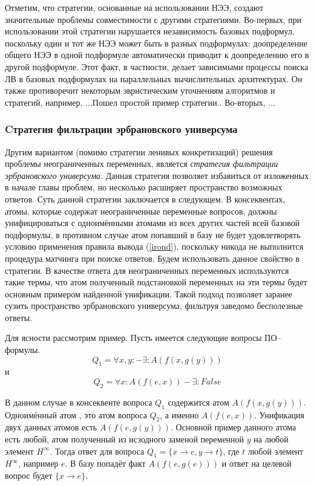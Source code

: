 Отметим, что стратегии, основанные на использовании НЭЭ, создают значительные проблемы совместимости с другими стратегиями. Во-первых, при использовании этой стратегии нарушается независимость базовых подформул, поскольку один и тот же НЭЭ может быть в разных подформулах: доопределение общего НЭЭ в одной подформуле автоматически приводит к доопределению его в другой подформуле. Этот факт, в частности, делает зависимыми процессы поиска ЛВ в базовых подформулах на параллельных вычислительных архитектурах. Он также противоречит некоторым эвристическим уточнениям алгоритмов и стратегий, например, {...}{Пошел простой пример стратегии.}. Во-вторых, ...

\subsubsection{Cтратегия фильтрации эрбрановского универсума}
Другим вариантом (помимо стратегии ленивых конкретизаций) решения проблемы неограниченных переменных, является \emph{стратегия фильтрации эрбрановского универсума}. Данная стратегия позволяет избавиться от изложенных в начале главы проблем, но несколько расширяет пространство возможных ответов. Суть данной стратегии заключается в следующем. В консеквентах, атомы, которые содержат неограниченные переменные вопросов, должны унифицироваться с одноимёнными атомами из всех других частей всей базовой подформулы, в противном случае атом попавший в базу не будет удовлетворять условию применения правила вывода (\ref{irond}), поскольку никода не выполнится процедура матчинга при поиске ответов. Будем использовать данное свойство в стратегии. В качестве ответа для неограниченных переменных используются такие термы, что атом полученный подстановкой переменных на эти термы будет основным примером найденной унификации. Такой подход позволяет заранее сузить пространство эрбрановского универсума, фильтруя заведомо бесполезные ответы.

Для ясности рассмотрим пример. Пусть имеется следующие вопросы ПО--формулы.
$$Q_1 = \forall x,y: - \exists: A(f(x,g(y)))$$
и
$$Q_2 = \forall x:A(f(e,x)) - \exists: False$$

В данном случае в консеквенте вопроса $Q_1$ содержится атом $A(f(x,g(y)))$. Одноимённый атом , это атом вопроса $Q_2$, а именно $A(f(e,x))$. Унификация двух данных атомов есть $A(f(e,g(y)))$. Основной пример данного атома есть любой, атом полученный из исзодного заменой переменной $y$ на любой элемент $H^{\infty}$. Тогда ответ для вопроса $Q_1 = \{x \rightarrow e, y \rightarrow t\}$, где $t$ любой элемент $H^{\infty}$, например $e$. В базу попадёт факт $A(f(e,g(e)))$ и ответ на целевой вопрос будет $\{x \rightarrow e\}$.

